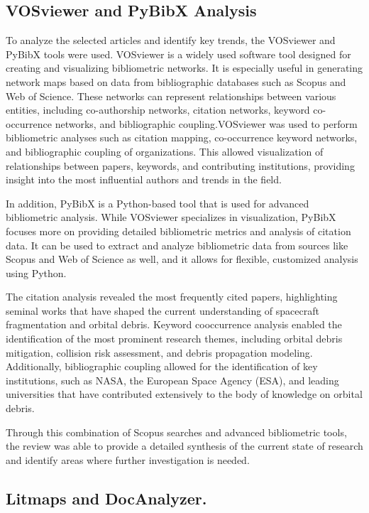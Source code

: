 \documentclass[journal ]{new-aiaa}
\begin{document}
\subsection{VOSviewer and PyBibX Analysis}
To analyze the selected articles and identify key trends, the VOSviewer and PyBibX tools were used. VOSviewer is a widely used software tool designed for creating and visualizing bibliometric networks. It is especially useful in generating network maps based on data from bibliographic databases such as Scopus and Web of Science. These networks can represent relationships between various entities, including co-authorship networks, citation networks, keyword co-occurrence networks, and bibliographic coupling.VOSviewer was used to perform bibliometric analyses such as citation mapping, co-occurrence keyword networks, and bibliographic coupling of organizations. This allowed visualization of relationships between papers, keywords, and contributing institutions, providing insight into the most influential authors and trends in the field.

In addition, PyBibX is a Python-based tool that is used for advanced bibliometric analysis. While VOSviewer specializes in visualization, PyBibX focuses more on providing detailed bibliometric metrics and analysis of citation data. It can be used to extract and analyze bibliometric data from sources like Scopus and Web of Science as well, and it allows for flexible, customized analysis using Python.

The citation analysis revealed the most frequently cited papers, highlighting seminal works that have shaped the current understanding of spacecraft fragmentation and orbital debris. Keyword cooccurrence analysis enabled the identification of the most prominent research themes, including orbital debris mitigation, collision risk assessment, and debris propagation modeling. Additionally, bibliographic coupling allowed for the identification of key institutions, such as NASA, the European Space Agency (ESA), and leading universities that have contributed extensively to the body of knowledge on orbital debris.

Through this combination of Scopus searches and advanced bibliometric tools, the review was able to provide a detailed synthesis of the current state of research and identify areas where further investigation is needed.

\subsection{Litmaps and DocAnalyzer.}
\end{document}
